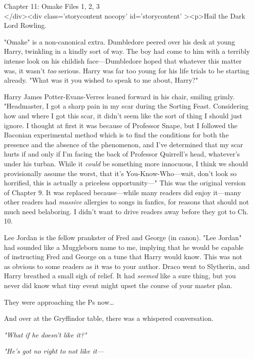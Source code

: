 
Chapter 11: Omake Files 1, 2, 3\\
</div><div  class='storycontent nocopy' id='storycontent' ><p>Hail the Dark 
Lord Rowling.

"Omake" is a non-canonical extra.
\sbreak
Dumbledore peered over his desk at young Harry, twinkling in a kindly sort of 
way. The boy had come to him with a terribly intense look on his childish 
face---Dumbledore hoped that whatever this matter was, it wasn't \emph{too} 
serious. Harry was far too young for his life trials to be starting already. 
"What was it you wished to speak to me about, Harry?"

Harry James Potter-Evans-Verres leaned forward in his chair, smiling grimly. 
"Headmaster, I got a sharp pain in my scar during the Sorting Feast. 
Considering how and where I got this scar, it didn't seem like the sort of 
thing I should just ignore. I thought at first it was because of Professor 
Snape, but I followed the Baconian experimental method which is to find the 
conditions for both the presence and the absence of the phenomenon, and I've 
determined that my scar hurts if and only if I'm facing the back of Professor 
Quirrell's head, whatever's under his turban. While it \emph{could} be 
something more innocuous, I think we should provisionally assume the worst, 
that it's You-Know-Who---wait, don't look so horrified, this is actually a 
priceless opportunity---"
\sbreak
This was the original version of Chapter 9. It was replaced because---while 
many readers did enjoy it---many other readers had \emph{massive} allergies to 
songs in fanfics, for reasons that should not much need belaboring. I didn't 
want to drive readers away before they got to Ch. 10.

Lee Jordan is the fellow prankster of Fred and George (in canon). "Lee Jordan" 
had sounded like a Muggleborn name to me, implying that he would be capable of 
instructing Fred and George on a tune that Harry would know. This was not as 
obvious to some readers as it was to your author.
\sbreak
Draco went to Slytherin, and Harry breathed a small sigh of relief. It had 
\emph{seemed} like a sure thing, but you never did know what tiny event might 
upset the course of your master plan.

They were approaching the Ps now{\ldots}

And over at the Gryffindor table, there was a whispered conversation.

\emph{"What if he doesn't like it?"}

\emph{"He's got no right to not like it---}

